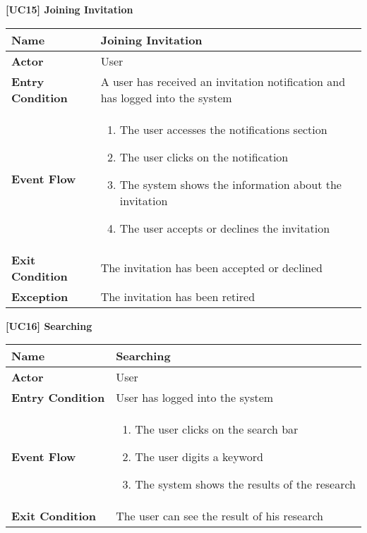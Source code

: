 \documentclass{article}
\begin{document}
\begin{table}
 \renewcommand{\arraystretch}{1.5}
    \centering
    \raggedright\textbf{[UC15] Joining Invitation}
    \begin{tabular}{|l|p{10cm}|}
        \hline
        \textbf{Name} & Joining Invitation \\
        \hline
        \textbf{Actor} & User \\
        \hline
        \textbf{Entry Condition} & A user has received an invitation notification and has logged into the system\\
        \hline
        \textbf{Event Flow} & 
        \begin{enumerate}[align=left, topsep=0pt, partopsep=0pt]
            \item The user accesses the notifications section
            \item The user clicks on the notification
            \item The system shows the information about the invitation
            \item The user accepts or declines the invitation
        \end{enumerate} \\
        \hline
        \textbf{Exit Condition} & The invitation has been accepted or declined \\
        \hline
        \textbf{Exception} & The invitation has been retired \\
        \hline
    \end{tabular}
\end{table}

\begin{table}
 \renewcommand{\arraystretch}{1.5}
    \centering
    \raggedright\textbf{[UC16] Searching}
    \begin{tabular}{|l|p{10cm}|}
        \hline
        \textbf{Name} & Searching \\
        \hline
        \textbf{Actor} & User \\
        \hline
        \textbf{Entry Condition} & User has logged into the system \\
        \hline
        \textbf{Event Flow} & 
        \begin{enumerate}[align=left, topsep=0pt, partopsep=0pt]
            \item The user clicks on the search bar 
            \item The user digits a keyword
            \item The system shows the results of the research
        \end{enumerate} \\
        \hline
        \textbf{Exit Condition} & The user can see the result of his research \\
        \hline
    \end{tabular}
\end{table}
\end{document}
